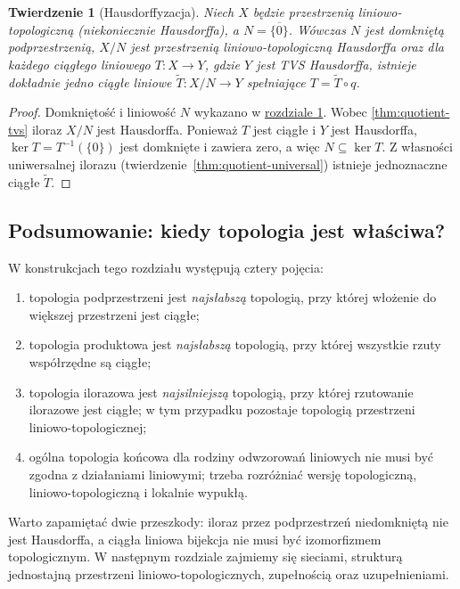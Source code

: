 \documentclass[11pt,a4paper]{article}
\numberwithin{equation}{section}
\theoremstyle{plain}
\newtheorem{twierdzenie}{Twierdzenie}[section]
\theoremstyle{definition}
\theoremstyle{remark}
\begin{document}
\begin{twierdzenie}[Hausdorffyzacja]\label{thm:hausdorffization}
Niech $X$ będzie przestrzenią liniowo-topologiczną
(niekoniecznie Hausdorffa), a $N=\overline{\{0\}}$.
Wówczas $N$ jest domkniętą podprzestrzenią, $X/N$
jest przestrzenią liniowo-topologiczną Hausdorffa
oraz dla każdego ciągłego liniowego $T:X\to Y$,
gdzie $Y$ jest TVS Hausdorffa, istnieje dokładnie
jedno ciągłe liniowe $\widetilde T:X/N\to Y$
spełniające $T=\widetilde T\circ q$.
\end{twierdzenie}
\begin{proof}
Domkniętość i liniowość $N$ wykazano w \hyperref[sec:tvs]{rozdziale 1}. Wobec
\ref{thm:quotient-tvs} iloraz $X/N$ jest Hausdorffa.
Ponieważ $T$ jest ciągłe i $Y$ jest Hausdorffa,
$\ker T=T^{-1}(\{0\})$ jest domknięte i zawiera zero,
a więc $N\subseteq\ker T$. Z własności uniwersalnej
ilorazu (twierdzenie~\ref{thm:quotient-universal})
istnieje jednoznaczne ciągłe $\widetilde T$.
\end{proof}

\subsection{Podsumowanie: kiedy topologia jest właściwa?}

W konstrukcjach tego rozdziału występują cztery pojęcia:
\begin{enumerate}[label=\textup{(\roman*)}]
\item topologia podprzestrzeni jest \emph{najsłabszą} topologią,
      przy której włożenie do większej przestrzeni jest ciągłe;
\item topologia produktowa jest \emph{najsłabszą} topologią,
      przy której wszystkie rzuty współrzędne są ciągłe;
\item topologia ilorazowa jest \emph{najsilniejszą} topologią,
      przy której rzutowanie ilorazowe jest ciągłe; w tym
      przypadku pozostaje topologią przestrzeni liniowo-topologicznej;
\item ogólna topologia końcowa dla rodziny odwzorowań liniowych
      nie musi być zgodna z działaniami liniowymi; trzeba
      rozróżniać wersję topologiczną, liniowo-topologiczną
      i lokalnie wypukłą.
\end{enumerate}

Warto zapamiętać dwie przeszkody: iloraz przez podprzestrzeń
niedomkniętą nie jest Hausdorffa, a ciągła liniowa bijekcja
nie musi być izomorfizmem topologicznym.
W następnym rozdziale zajmiemy się sieciami, strukturą jednostajną
przestrzeni liniowo-topologicznych, zupełnością oraz uzupełnieniami.
\end{document}
